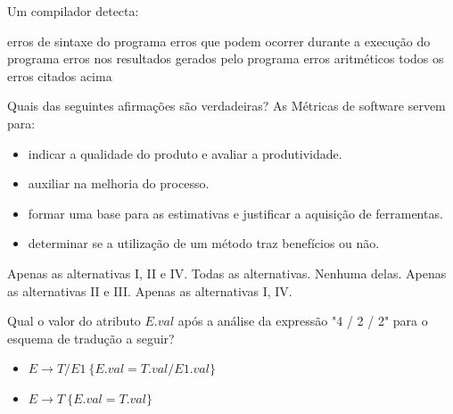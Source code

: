 \documentclass[12pt, addpoints]{exam}
\begin{document}
    \begin{questions}

    \newpage
    \question

Um compilador detecta:
\begin{choices}
\choice erros de sintaxe do programa 
\choice erros que podem ocorrer durante a execução do programa
\choice erros nos resultados gerados pelo programa
\choice erros aritméticos
\choice todos os erros citados acima
\end{choices}

\question

Quais das seguintes afirmações são verdadeiras? As Métricas de software servem para:



\begin{itemize}

    \item[I)] indicar a qualidade do produto e avaliar a produtividade.

    \item[II)] auxiliar na melhoria do processo.

    \item[III)] formar uma base para as estimativas e justificar a aquisição de ferramentas.

    \item[IV)] determinar se a utilização de um método traz benefícios ou não.

\end{itemize}
\begin{choices}
\choice Apenas as alternativas I, II e IV.
\choice Todas as alternativas.
\choice Nenhuma delas.
\choice Apenas as alternativas II e III.
\choice Apenas as alternativas I, IV.
\end{choices}

\question

Qual o valor do atributo \( E.val \) após a análise da expressão "4 / 2 / 2" para o esquema de tradução a seguir?



\begin{itemize}

    \item \( E \rightarrow T / E1 \ \{ E.val = T.val / E1.val \} \)

    \item \( E \rightarrow T \ \{ E.val = T.val \} \)


\end{itemize}
\end{questions}
\end{document}
